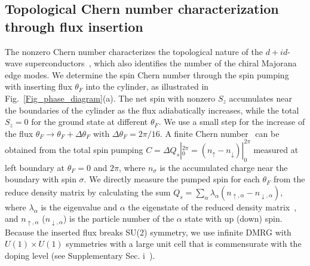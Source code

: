 \documentclass[aps,prx,reprint,superscriptaddress,showpacs]{revtex4-2}
\begin{document}
\subsection{Topological Chern number characterization  through flux insertion}
\label{flux_insertion}
The nonzero  Chern number characterizes the topological nature of the $d+id$-wave superconductors~\cite{read2000paired,senthil1999spin}, which also identifies the number of the chiral Majorana edge modes. 
We determine  the spin Chern number through the spin pumping with inserting flux $\theta _{F}$ into the cylinder, as illustrated in Fig.~\ref{Fig_phase_diagram}(a).  The net spin with nonzero $S_z$ accumulates near the boundaries of the cylinder as the flux adiabatically increases, while the total $S_{z}=0$ for the ground state at different $\theta_F$. We use a small step for the increase of the flux $\theta_F \rightarrow \theta_F+\Delta \theta_F$ with $\Delta \theta_F=2\pi/16$.
A finite Chern number~\cite{gong2014} can be obtained from the total spin  pumping $C=\Delta Q_{s}|_0^{2\pi}= (n_{\uparrow}-n_{\downarrow})|_0^{2\pi}$  measured at left boundary  at $\theta _{F}=0$ and $2\pi$, where $n_{\sigma}$ is the accumulated charge near the boundary with spin $\sigma$.  We directly measure the pumped spin  for each $\theta_F$ from the reduce density matrix by calculating the sum $Q_{s}=\sum_{\alpha}\lambda _{\alpha}(n_{\uparrow,\alpha}-n_{\downarrow,\alpha})$, where  $\lambda _ {\alpha }$ is the eigenvalue  and $\alpha$ the eigenstate of the reduced density matrix~\cite{grushin2015characterization}, and  $n_{\uparrow,\alpha}$ ($n_{\downarrow,\alpha}$) is the particle number of the  $\alpha$ state with up (down) spin. Because the inserted flux breaks SU(2) symmetry, we use infinite DMRG with $U(1)\times U(1)$ symmetries with a large unit cell that is commensurate with the doping level (see Supplementary Sec. i~\cite{SuppMaterial}). 
\end{document}
